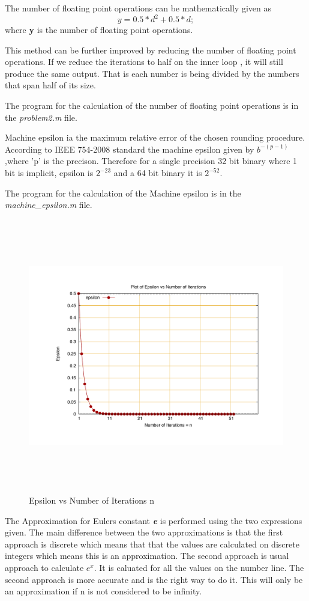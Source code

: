 \documentclass[fleqn,letterpaper,12pt]{report}
\begin{document}
The number of floating point operations can be mathematically given as $$y = 0.5*d^2 + 0.5*d ;$$
where {\bf y} is the number of floating point operations.

This method can be further improved by reducing the number of floating point operations. If we reduce the iterations to half on the inner loop , it will still produce the same output. That is each number is being divided by the numbers that span half of its size. 

The program for the calculation of the number of floating point operations is in the {\em problem2.m} file.
%
\newpage
{}
{}
\problem
Machine epsilon ia the maximum relative error of the chosen rounding procedure. According to IEEE 754-2008 standard the machine epsilon given by  $ b^{-(p-1)} $ ,where 'p' is the precison. Therefore for a single precision 32 bit binary where 1 bit is implicit, epsilon is $ 2^{-23} $ and a 64 bit binary it is $ 2^{-52} $.

The program for the calculation of the Machine epsilon is in the {\em machine\_epsilon.m} file.
\begin{figure}[ht!]
	\centering
	\includegraphics[height=120mm,width=160mm]{machine_epsilon.pdf}
	\caption{Epsilon vs Number of Iterations n\label{overflow}}
\end{figure}

%
\newpage
{}
{}
\problem
The Approximation for Eulers constant {\bf \em e} is performed using the two expressions given. The main difference between the two approximations is that the first approach is discrete which means that that the values are calculated on discrete integers which means this is an approximation. The second approach is usual approach to calculate $ e^x$. It is caluated for all the values on the number line. The second approach is more accurate and is the right way to do it. This will only be an approximation if n is not considered to be infinity.
\end{document}
